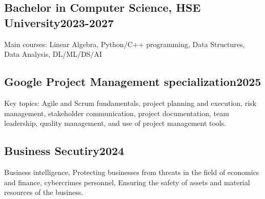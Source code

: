 
\subsection{{Bachelor in Computer Science, HSE University}\hfill 2023-2027}
\vspace*{3pt}
Main courses: Linear Algebra, Python/C++ programming, Data Structures, Data Analysis, DL/ML/DS/AI

\vspace*{6pt}

\subsection{Google Project Management specialization\hfill 2025}
\vspace*{3pt}
Key topics: Agile and Scrum fundamentals, project planning and execution, risk management, stakeholder communication, project documentation, team leadership, quality management, and use of project management tools. 

\vspace*{6pt}

\subsection{{Business Secutiry}\hfill 2024}
\vspace*{3pt}
Business intelligence, Protecting businesses from threats in the field of economics and finance, cybercrimes personnel, Ensuring the safety of assets and material resources of the business.

\vspace*{6pt}



